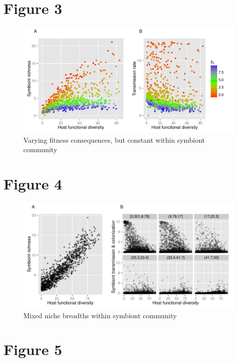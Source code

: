 \documentclass[12pt]{article}
\begin{document}
\newpage

\section*{Figure 3}

\begin{figure}[ht]\centering
\includegraphics[width=\linewidth]{fig/fig3.pdf}
\caption{Varying fitness consequences, but constant within symbiont community}
\label{fig:fig3}
\end{figure}

\newpage

\section*{Figure 4}

\begin{figure}[ht]\centering
\includegraphics[width=\linewidth]{fig/fig4.pdf}
\caption{Mixed niche breadths within symbiont community}
\label{fig:fig4}
\end{figure}

\newpage

\section*{Figure 5}
\end{document}
